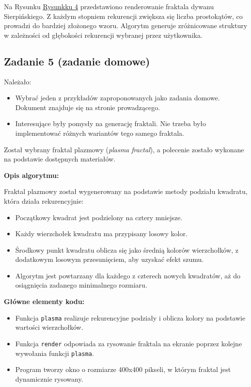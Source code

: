 \documentclass[a4paper, 12pt]{article}
\begin{document}
Na Rysunku \hyperref[fig:zad4]{Rysunkku 4} przedstawiono renderowanie fraktala dywanu Sierpińskiego. Z każdym stopniem rekurencji zwiększa się liczba prostokątów, co prowadzi do bardziej złożonego wzoru. Algorytm generuje zróżnicowane struktury w zależności od głębokości rekurencji wybranej przez użytkownika.



\subsection{Zadanie 5 (zadanie domowe)}

Należało:
\begin{itemize}
    \item Wybrać jeden z przykładów zaproponowanych jako zadania domowe. Dokument znajduje się na stronie prowadzącego.
    \item Interesujące były pomysły na generację fraktali. Nie trzeba było implementować różnych wariantów tego samego fraktala.
\end{itemize}

Został wybrany fraktal plazmowy (\textit{plasma fractal}), a polecenie zostało wykonane na podstawie dostępnych materiałów.

\textbf{Opis algorytmu:}

Fraktal plazmowy został wygenerowany na podstawie metody podziału kwadratu, która działa rekurencyjnie:

\begin{itemize}
    \item Początkowy kwadrat jest podzielony na cztery mniejsze.
    \item Każdy wierzchołek kwadratu ma przypisany losowy kolor.
    \item Środkowy punkt kwadratu oblicza się jako średnią kolorów wierzchołków, z dodatkowym losowym przesunięciem, aby uzyskać efekt szumu.
    \item Algorytm jest powtarzany dla każdego z czterech nowych kwadratów, aż do osiągnięcia zadanego minimalnego rozmiaru.
\end{itemize}

\textbf{Główne elementy kodu:}

\begin{itemize}
    \item Funkcja \texttt{plasma} realizuje rekurencyjne podziały i oblicza kolory na podstawie wartości wierzchołków.
    \item Funkcja \texttt{render} odpowiada za rysowanie fraktala na ekranie poprzez kolejne wywołania funkcji \texttt{plasma}.
    \item Program tworzy okno o rozmiarze 400x400 pikseli, w którym fraktal jest dynamicznie rysowany.
\end{itemize}
\end{document}
